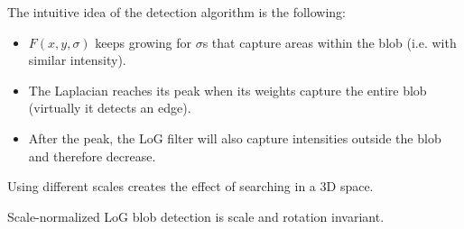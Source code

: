 \begin{remark}
    The intuitive idea of the detection algorithm is the following:
    \begin{itemize}
        \item $F(x, y, \sigma)$ keeps growing for $\sigma$s that capture areas within the blob (i.e. with similar intensity).
        \item The Laplacian reaches its peak when its weights capture the entire blob (virtually it detects an edge).
        \item After the peak, the LoG filter will also capture intensities outside the blob and therefore decrease.
    \end{itemize}
\end{remark}

\begin{remark}
    Using different scales creates the effect of searching in a 3D space.
\end{remark}

\begin{remark}
    Scale-normalized LoG blob detection is scale and rotation invariant.
\end{remark}




